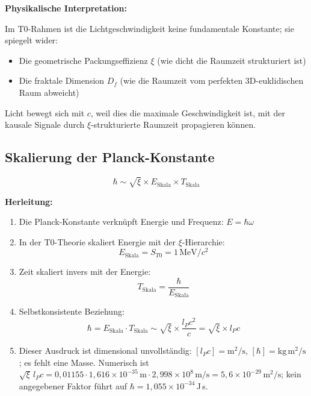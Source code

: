 	\textbf{Physikalische Interpretation:}
	
	Im T0-Rahmen ist die Lichtgeschwindigkeit keine fundamentale Konstante; sie spiegelt wider:
	\begin{itemize}
		\item Die geometrische Packungseffizienz $\xi$ (wie dicht die Raumzeit strukturiert ist)
		\item Die fraktale Dimension $D_f$ (wie die Raumzeit vom perfekten 3D-euklidischen Raum abweicht)
	\end{itemize}
	
	Licht bewegt sich mit $c$, weil dies die maximale Geschwindigkeit ist, mit der kausale Signale durch $\xi$-strukturierte Raumzeit propagieren können.
	
	\subsection{Skalierung der Planck-Konstante}
	
	\begin{keyresult}
		\[
		\hbar \sim \sqrt{\xi} \times E_{\text{Skala}} \times T_{\text{Skala}}
		\]
	\end{keyresult}
	
	\textbf{Herleitung:}
	
	\begin{enumerate}
		\item Die Planck-Konstante verknüpft Energie und Frequenz: $E = \hbar \omega$
		
		\item In der T0-Theorie skaliert Energie mit der $\xi$-Hierarchie:
		\[
		E_{\text{Skala}} = S_{T0} = 1\,\text{MeV}/c^2
		\]
		
		\item Zeit skaliert invers mit der Energie:
		\[
		T_{\text{Skala}} = \frac{\hbar}{E_{\text{Skala}}}
		\]
		
		\item Selbstkonsistente Beziehung:
		\[
		\hbar = E_{\text{Skala}} \cdot T_{\text{Skala}} \sim \sqrt{\xi} \times \frac{l_P c^2}{c} = \sqrt{\xi} \times l_P c
		\]
		
		\item Dieser Ausdruck ist dimensional unvollständig: $[l_P c] = \text{m}^2/\text{s}$, $[\hbar] = \text{kg}\,\text{m}^2/\text{s}$; es fehlt eine Masse. Numerisch ist $\sqrt{\xi}\, l_P c = 0{,}01155 \cdot 1{,}616 \times 10^{-35}\,\text{m} \cdot 2{,}998 \times 10^{8}\,\text{m/s} = 5{,}6 \times 10^{-29}\,\text{m}^2/\text{s}$; kein angegebener Faktor führt auf $\hbar = 1{,}055 \times 10^{-34}$\,J\,s.
	\end{enumerate}
	

